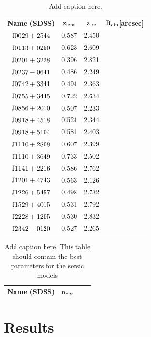 \documentclass[a4paper,fleqn,usenatbib]{mnras}
\begin{document}
\begin{table}
\caption{Add caption here.}
\begin{tabular}{cccc}
\hline
 Name (SDSS) &$\rm{z_{lens}}$&$\rm{z_{src}}$&$\rm{R_{ein}}$[arcsec]\\
 \hline
$\rm{J0029+2544}$&0.587&2.450\\
$\rm{J0113+0250}$&0.623&2.609\\
$\rm{J0201+3228}$&0.396&2.821\\
$\rm{J0237-0641}$&0.486&2.249\\
$\rm{J0742+3341}$&0.494&2.363\\
$\rm{J0755+3445}$&0.722&2.634\\
$\rm{J0856+2010}$&0.507&2.233\\
$\rm{J0918+4518}$&0.524&2.344\\
$\rm{J0918+5104}$&0.581&2.403\\
$\rm{J1110+2808}$&0.607&2.399\\
$\rm{J1110+3649}$&0.733&2.502\\
$\rm{J1141+2216}$&0.586&2.762\\
$\rm{J1201+4743}$&0.563&2.126\\
$\rm{J1226+5457}$&0.498&2.732\\
$\rm{J1529+4015}$&0.531&2.792\\
$\rm{J2228+1205}$&0.530&2.832\\
$\rm{J2342-0120}$&0.527&2.265\\
 \hline
\end{tabular}
\label{tbl:list} 
\end{table}


\begin{table}
\caption{Add caption here. This table should contain the best parameters for the sersic models}
\begin{tabular}{cccc}
\hline
 Name (SDSS) &$\rm{n_{Ser}}$\\
 \hline

 \hline
\end{tabular}
\label{tbl:sersic} 
\end{table}

\section{Results}
%
\end{document}
